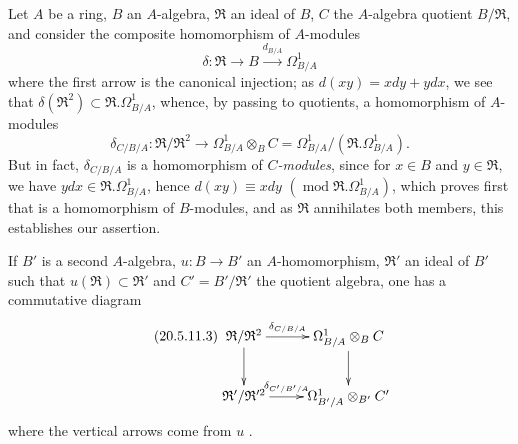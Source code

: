 \begin{env}[20.5.11]
\label{0.20.5.11}
Let $A$ be a ring, $B$ an $A$-algebra, $\mathfrak{R}$ an ideal of $B$, $C$ the $A$-algebra quotient $B/\mathfrak{R}$, and consider the composite homomorphism of $A$-modules
\begin{equation}
\tag{20.5.11.1}
  \label{0.20.5.11.1}
  \delta:\mathfrak{R}\to B\xrightarrow{d_{B/A}}\Omega^1_{B/A}
\end{equation}
where the first arrow is the canonical injection; as $d(xy)=xdy+ydx$, we see that $\delta(\mathfrak{R}^2)\subset\mathfrak{R}.\Omega^1_{B/A}$, whence, by passing to quotients, a homomorphism of $A$-modules
\begin{equation}
\tag{20.5.11.2}
  \label{0.20.5.11.2}
  \delta_{C/B/A}:\mathfrak{R}/\mathfrak{R}^2\to\Omega^1_{B/A}\otimes_B C=\Omega^1_{B/A}/(\mathfrak{R}.\Omega^1_{B/A}).
\end{equation}
But in fact, $\delta_{C/B/A}$ is a homomorphism of \emph{$C$-modules}, since for $x\in B$ and $y\in\mathfrak{R}$, we have $ydx\in\mathfrak{R}.\Omega^1_{B/A}$, hence $d(xy)\equiv xdy$ $(\operatorname{mod}\mathfrak{R}.\Omega^1_{B/A})$, which proves first that  is a homomorphism of $B$-modules, and as $\mathfrak{R}$ annihilates both members, this establishes our assertion.

If $B'$ is a second $A$-algebra, $u:B\to B'$ an $A$-homomorphism, $\mathfrak{R}'$ an ideal of $B'$ such that $u(\mathfrak{R})\subset\mathfrak{R}'$ and $C'=B'/\mathfrak{R}'$ the quotient algebra, one has a commutative diagram
\begin{equation}
\tag{20.5.11.3}
  \label{0.20.5.11.3}
\xymatrix{
  \mathfrak{R}/\mathfrak{R}^2 \ar[r]^-{\delta_{C/B/A}} \ar[d] & \Omega^1_{B/A}\otimes_B C \ar[d] \\
  \mathfrak{R}'/\mathfrak{R}'^2 \ar[r]^-{\delta_{C'/B'/A}} & \Omega^1_{B'/A}\otimes_{B'} C'
}
\end{equation}
where the vertical arrows come from $u$ .
\end{env}

